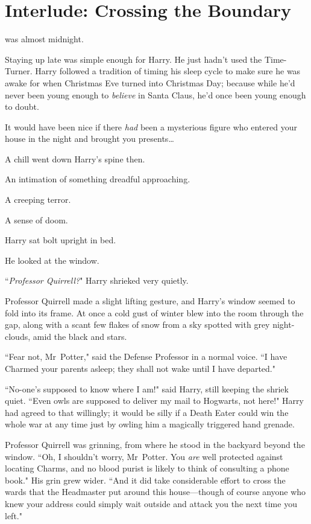 \chapter{Interlude: Crossing the Boundary}

 was almost midnight.

\hplettrineextrapara
Staying up late was simple enough for Harry. He just hadn't used the Time-Turner. Harry followed a tradition of timing his sleep cycle to make sure he was awake for when Christmas Eve turned into Christmas Day; because while he'd never been young enough to \emph{believe} in Santa Claus, he'd once been young enough to doubt.

It would have been nice if there \emph{had} been a mysterious figure who entered your house in the night and brought you presents{\ldots}

A chill went down Harry's spine then.

An intimation of something dreadful approaching.

A creeping terror.

A sense of doom.

Harry sat bolt upright in bed.

He looked at the window.

``\emph{Professor Quirrell?}" Harry shrieked very quietly.

Professor Quirrell made a slight lifting gesture, and Harry's window seemed to fold into its frame. At once a cold gust of winter blew into the room through the gap, along with a scant few flakes of snow from a sky spotted with grey night-clouds, amid the black and stars.

``Fear not, Mr~Potter," said the Defense Professor in a normal voice. ``I have Charmed your parents asleep; they shall not wake until I have departed."

``No-one's supposed to know where I am!" said Harry, still keeping the shriek quiet. ``Even owls are supposed to deliver my mail to Hogwarts, not here!" Harry had agreed to that willingly; it would be silly if a Death Eater could win the whole war at any time just by owling him a magically triggered hand grenade.

Professor Quirrell was grinning, from where he stood in the backyard beyond the window. ``Oh, I shouldn't worry, Mr~Potter. You \emph{are} well protected against locating Charms, and no blood purist is likely to think of consulting a phone book." His grin grew wider. ``And it did take considerable effort to cross the wards that the Headmaster put around this house—though of course anyone who knew your address could simply wait outside and attack you the next time you left."

